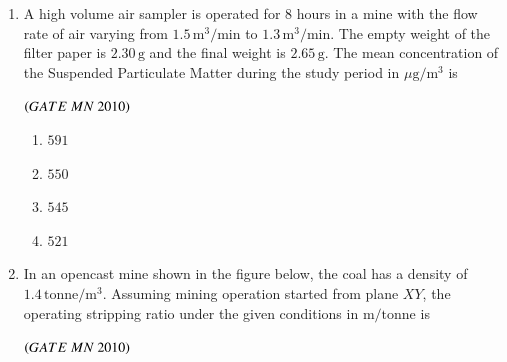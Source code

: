 \documentclass{article}
\begin{document}
\begin{enumerate}[label=Q.\arabic*., itemsep=1em, leftmargin=0pt, itemindent=*, labelsep=0.5em]
\begin{enumerate}[label=Q.\arabic*., start=17, leftmargin=2em]
\begin{enumerate}[label=Q.\arabic*., start=33, leftmargin=2em]
\begin{table}[h!]
\begin{tabular}{|c|c|c|c|c|c|}
\hline
\multicolumn{2}{|c|}{\textbf{Demand}} & $50$ & $120$ & $30$ & \\
\hline
\end{tabular}
\end{table}
\\
The transportation cost of the initial basic feasible solution obtained by the North-West corner rule is 
\\
\begin{flushright}
\hfill$\brak{GATE\ MN\ 2010}$
\end{flushright}
\begin{multicols}{4}
\begin{enumerate}[label=(\Alph*), leftmargin=4em]
\item $1025$
\item $1075$
\item $1130$
\item $1226$
\end{enumerate}
\end{multicols}
\bigskip
\item A high volume air sampler is operated for 8 hours in a mine with the flow rate of air varying from 
$1.5\, \mathrm{m}^3/\mathrm{min}$ to $1.3\, \mathrm{m}^3/\mathrm{min}$. The empty weight of the filter paper is 
$2.30\, \mathrm{g}$ and the final weight is $2.65\, \mathrm{g}$. The mean concentration of the Suspended 
Particulate Matter  during the study period in $\mu\mathrm{g}/\mathrm{m}^3$ is
\\
\begin{flushright}
\hfill$\brak{GATE\ MN\ 2010}$
\end{flushright}
\begin{multicols}{4}
\begin{enumerate}[label=(\Alph*), leftmargin=4em]
\item $591$
\item $550$
\item $ 545$
\item $ 521$
\end{enumerate}
\end{multicols}
\bigskip
\item In an opencast mine shown in the figure below, the coal has a density of $1.4\, \mathrm{tonne}/\mathrm{m}^3$. Assuming
mining operation started from plane $XY$, the operating stripping ratio under the given conditions in 
$\mathrm{m}/\mathrm{tonne}$ is
\\
\begin{flushright}
\hfill$\brak{GATE\ MN\ 2010}$

\end{flushright}
\end{enumerate}
\end{enumerate}
\end{enumerate}
\end{document}
